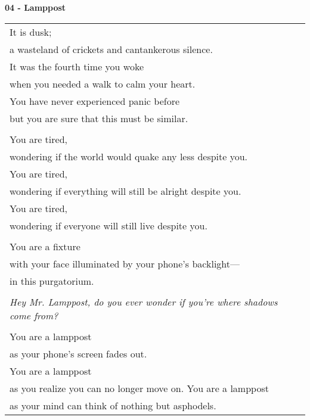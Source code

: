 \documentclass{article}
\begin{document}
\begin{center}
\textbf{04 - Lamppost} \\
\vspace*{2ex}
\begin{tabular}{l} 
It is dusk; \\
a wasteland of crickets and cantankerous silence. \\

It was the fourth time you woke \\
when you needed a walk to calm your heart. \\

You have never experienced panic before \\
but you are sure that this must be similar. \\
\\
You are tired, \\
  wondering if the world would quake any less despite you. \\
You are tired, \\
  wondering if everything will still be alright despite you. \\
You are tired, \\
  wondering if everyone will still live despite you. \\
\\
You are a fixture \\
with your face illuminated by your phone's backlight--- \\
  in this purgatorium. \\
\\
\textit{Hey Mr. Lamppost, do you ever wonder if you're where shadows come from?} \\
\\
You are a lamppost \\
  as your phone's screen fades out. \\
You are a lamppost \\
  as you realize you can no longer move on.
You are a lamppost \\
  as your mind can think of nothing but asphodels. \\
\end{tabular}
\end{center}
\end{document}
